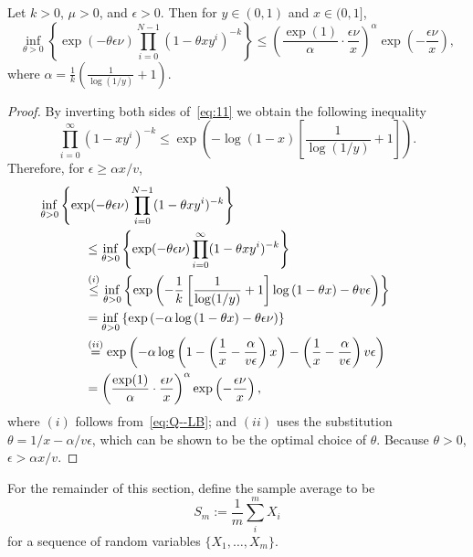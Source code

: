 \begin{lem} \label{Fact:Tedious_Bound} Let
  $k>0$, $\mu>0$, and $\epsilon>0$. Then for $y\in(0,1)$ and $x\in(0,1]$,
\[
\inf_{\theta>0}\left\{
  \exp(-\theta\epsilon\nu)\prod_{i=0}^{N-1}\left(1-\theta
    xy^{i}\right)^{-k}\right\} \leq
\left(\frac{\exp(1)}{\alpha}\cdot \frac{\epsilon\nu}{x}\right)^{\alpha}\exp\left(-\frac{\epsilon\nu}{x}\right),
\]
where $\alpha=\frac{1}{k}\left(\frac{1}{\log(1/y)}+1\right)$.
\end{lem}
\begin{proof}
  By inverting both sides of~\eqref{eq:11} we obtain the following
  inequality
\begin{equation} \label{eq:Q--LB}
  \prod_{i=0}^{\infty}(1-xy^{i})^{-k}
  \leq
  \exp\left(-\log(1-x)\left[\frac{1}{\log(1/y)}+1\right]\right).
\end{equation}
Therefore, for $\epsilon\geq\alpha x/v$,
\begin{align*}
  &\hspace*{-.5in}\inf_{\theta>0} \left\{
    \exp(-\theta\epsilon\nu)\prod_{i=0}^{N-1}(1-\theta xy^{i})^{-k}
  \right\}
  \\
  &\leq\inf_{\theta>0} \left\{
    \exp(-\theta\epsilon\nu)\prod_{i=0}^{\infty}(1-\theta xy^{i})^{-k}
  \right\}
  \\
  &\overset{(i)}{\leq}\inf_{\theta>0} \left\{ \exp \left( -\frac{1}{k}
      \left[ \frac{1}{\log(1/y)}+1 \right]\log \left( 1-\theta x
      \right) -\theta v\epsilon \right) \right\}
  \\
  &=\inf_{\theta>0} \left\{ \exp \left( -\alpha\log \left( 1-\theta x
      \right) -\theta\epsilon\nu \right) \right\}
  \\
  &\overset{(ii)}{=}\exp \left( -\alpha\log
    \left(1- \left( \frac{1}{x}-\frac{\alpha}{v\epsilon} \right)x
    \right)- \left( \frac{1}{x}-\frac{\alpha}{v\epsilon} \right)
    v\epsilon \right)
  \\
  &= \left(\frac{\exp(1)}{\alpha}\cdot
    \frac{\epsilon\nu}{x}\right)^{\alpha}\exp\left(-\frac{\epsilon\nu}{x}\right),
\end{align*}
where $(i)$ follows from~\eqref{eq:Q--LB}; and $(ii)$ uses the
substitution $\theta=1/x-\alpha/v\epsilon$, which can be shown to be
the optimal choice of $\theta$. Because $\theta>0$, $\epsilon>\alpha
x/v$.
\end{proof}

For the remainder of this section, define the sample average to be
\[
S_{m} := \frac{1}{m}\sum_{i}^{m}X_{i}
\]
for a sequence of random variables $\{X_{1},\ldots,X_{m}\}$.

